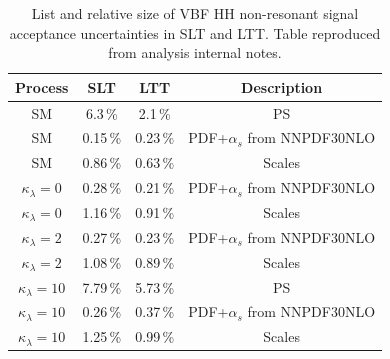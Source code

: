 \begin{table}[!htb]
\centering
\small
\begin{tabular}{|c|c|c|c|}
\hline
Process  & SLT & LTT & Description\\
\hline
SM  & 6.3\,\% & 2.1\,\% & PS\\
SM &  0.15\,\% &  0.23\,\% & PDF+$\alpha_s$ from NNPDF30NLO\\
SM  &  0.86\,\% &  0.63\,\% & Scales \\
$\kappa_\lambda = 0$ & 0.28\,\% & 0.21\,\% &PDF+$\alpha_s$ from NNPDF30NLO\\
$\kappa_\lambda = 0$ & 1.16\,\% & 0.91\,\% &Scales\\
$\kappa_\lambda = 2$ & 0.27\,\% & 0.23\,\% &PDF+$\alpha_s$ from NNPDF30NLO\\
$\kappa_\lambda = 2$ & 1.08\,\% & 0.89\,\% &Scales\\
$\kappa_\lambda = 10$ & 7.79\,\% & 5.73\,\% &PS\\
$\kappa_\lambda = 10$ & 0.26\,\% & 0.37\,\% &PDF+$\alpha_s$ from NNPDF30NLO\\
$\kappa_\lambda = 10$& 1.25\,\% & 0.99\,\% &Scales\\
\hline
\end{tabular}
\caption{List and relative size of VBF HH non-resonant signal acceptance uncertainties in SLT and LTT.
Table reproduced from analysis internal notes.}
\label{tab:systematics_HHNonResSignalVBF_AcceptanceNumbers}
\end{table}











